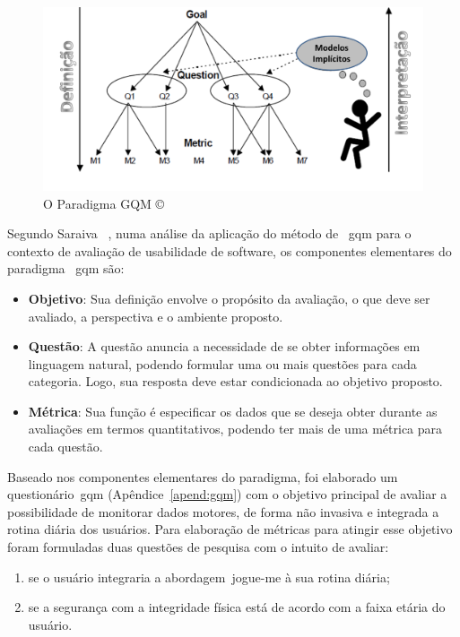 \begin{figure}[!htbp]
 \centering
 \includegraphics[scale=0.50]{./img/gqm.png}
 \caption[O Paradigma GQM \copyright]{O Paradigma GQM \copyright~\cite{van1999goal}}
 \label{fig:gqm}
\end{figure}

Segundo Saraiva ~\cite{saraiva2006}, numa análise da aplicação do método de ~\ac{gqm} para o contexto de avaliação de usabilidade de software, os componentes elementares do paradigma ~\ac{gqm} são:

\begin{itemize}
	\item \textbf{Objetivo}: Sua definição envolve o propósito da avaliação, o que deve ser avaliado, a perspectiva e o ambiente proposto.
	\item \textbf{Questão}: A questão anuncia a necessidade de se obter informações em linguagem natural, podendo formular uma ou mais questões para cada categoria. Logo, sua resposta deve estar condicionada ao objetivo proposto.
	\item \textbf{Métrica}: Sua função é especificar os dados que se deseja obter durante as avaliações em termos quantitativos, podendo ter mais de uma métrica para cada questão.	
\end{itemize}

Baseado nos componentes elementares do paradigma, foi elaborado um questionário~\ac{gqm} (Apêndice~\ref{apend:gqm}) com o objetivo principal de avaliar a possibilidade de monitorar dados motores, de forma não invasiva e integrada a rotina diária dos usuários. Para elaboração de métricas para atingir esse objetivo foram formuladas duas questões de pesquisa com o intuito de avaliar:
\begin{enumerate}
	\item se o usuário integraria a abordagem~\ac{jogue-me} à sua rotina diária;
	\item se a segurança com a integridade física está de acordo com a faixa etária do usuário.
\end{enumerate}

